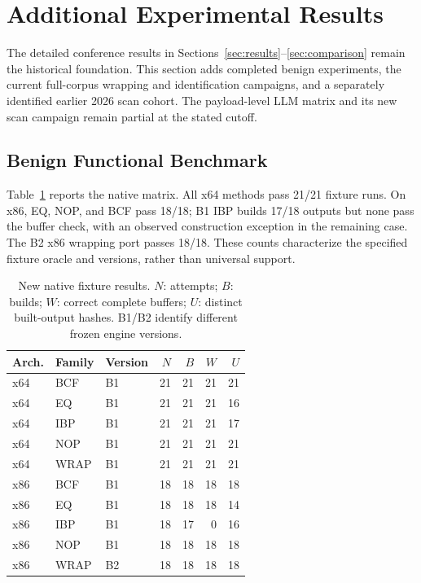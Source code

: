 \section{Additional Experimental Results}\label{sec:extended_results}
The detailed conference results in Sections~\ref{sec:results}--\ref{sec:comparison}
remain the historical foundation. This section adds completed benign
experiments, the current full-corpus wrapping and identification
campaigns, and a separately identified earlier 2026 scan cohort.
The payload-level LLM matrix and its new scan campaign remain partial
at the stated cutoff.

\subsection{Benign Functional Benchmark}
Table~\ref{tab:new_native} reports the native matrix. All x64 methods
pass 21/21 fixture runs. On x86, EQ, NOP, and BCF pass 18/18;
B1 IBP builds 17/18 outputs but none pass the buffer check, with
an observed construction exception in the remaining case. The B2
x86 wrapping port passes 18/18. These counts characterize the
specified fixture oracle and versions, rather than universal support.

\begin{table}[t]
\caption{New native fixture results. $N$: attempts; $B$: builds;
$W$: correct complete buffers; $U$: distinct built-output hashes.
B1/B2 identify different frozen engine versions.}
\label{tab:new_native}
\centering\small
\begin{tabular}{@{}lllrrrr@{}}
\toprule
Arch. & Family & Version & $N$ & $B$ & $W$ & $U$ \\
\midrule
x64 & BCF & B1 & 21 & 21 & 21 & 21 \\
x64 & EQ & B1 & 21 & 21 & 21 & 16 \\
x64 & IBP & B1 & 21 & 21 & 21 & 17 \\
x64 & NOP & B1 & 21 & 21 & 21 & 21 \\
x64 & WRAP & B1 & 21 & 21 & 21 & 21 \\
x86 & BCF & B1 & 18 & 18 & 18 & 18 \\
x86 & EQ & B1 & 18 & 18 & 18 & 14 \\
x86 & IBP & B1 & 18 & 17 & 0 & 16 \\
x86 & NOP & B1 & 18 & 18 & 18 & 18 \\
x86 & WRAP & B2 & 18 & 18 & 18 & 18 \\
\bottomrule
\end{tabular}
\end{table}

